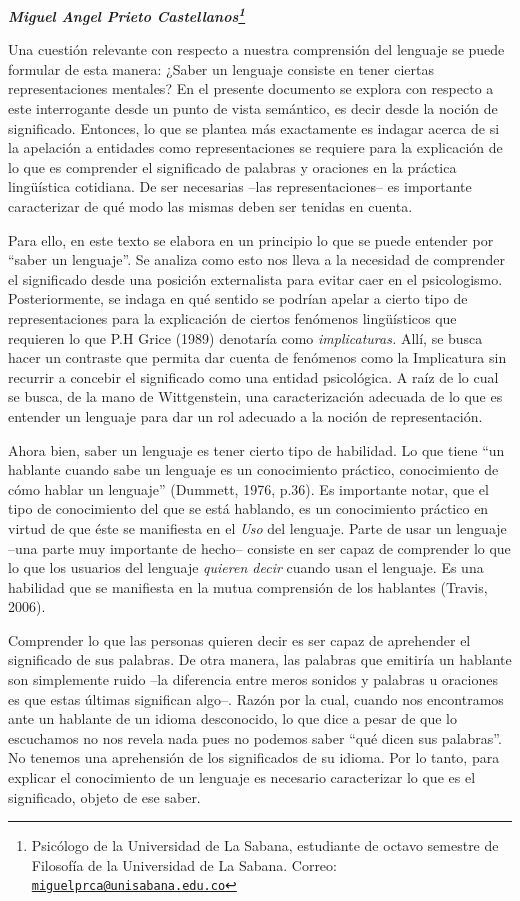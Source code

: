 \documentclass[]{book}
\newcommand{\autor}[1]{            %
  \begin{center}                   %
    \vspace*{-3.5em}               %
    \textbf{\textit{\large #1}}    %
    \vspace*{+4em}                 %
  \end{center}
}
\begin{document}
\autor{Miguel Angel Prieto Castellanos\footnote{Psicólogo de la
  Universidad de La Sabana, estudiante de octavo semestre de Filosofía
  de la Universidad de La Sabana. Correo:
  \href{mailto:miguelprca@unisabana.edu.co}{\nolinkurl{miguelprca@unisabana.edu.co}}}}

Una cuestión relevante con respecto a nuestra comprensión del lenguaje
se puede formular de esta manera: ¿Saber un lenguaje consiste en tener
ciertas representaciones mentales? En el presente documento se explora
con respecto a este interrogante desde un punto de vista semántico, es
decir desde la noción de significado. Entonces, lo que se plantea más
exactamente es indagar acerca de si la apelación a entidades como
representaciones se requiere para la explicación de lo que es comprender
el significado de palabras y oraciones en la práctica lingüística
cotidiana. De ser necesarias --las representaciones-- es importante
caracterizar de qué modo las mismas deben ser tenidas en cuenta.

Para ello, en este texto se elabora en un principio lo que se puede
entender por ``saber un lenguaje''. Se analiza como esto nos lleva a la
necesidad de comprender el significado desde una posición externalista
para evitar caer en el psicologismo. Posteriormente, se indaga en qué
sentido se podrían apelar a cierto tipo de representaciones para la
explicación de ciertos fenómenos lingüísticos que requieren lo que P.H
Grice (1989) denotaría como \emph{implicaturas.} Allí, se busca hacer un
contraste que permita dar cuenta de fenómenos como la Implicatura sin
recurrir a concebir el significado como una entidad psicológica. A raíz
de lo cual se busca, de la mano de Wittgenstein, una caracterización
adecuada de lo que es entender un lenguaje para dar un rol adecuado a la
noción de representación.

Ahora bien, saber un lenguaje es tener cierto tipo de habilidad. Lo que
tiene ``un hablante cuando sabe un lenguaje es un conocimiento práctico,
conocimiento de cómo hablar un lenguaje'' (Dummett, 1976, p.36). Es
importante notar, que el tipo de conocimiento del que se está hablando,
es un conocimiento práctico en virtud de que éste se manifiesta en el
\emph{Uso} del lenguaje. Parte de usar un lenguaje --una parte muy
importante de hecho-- consiste en ser capaz de comprender lo que lo que
los usuarios del lenguaje \emph{quieren decir} cuando usan el lenguaje.
Es una habilidad que se manifiesta en la mutua comprensión de los
hablantes (Travis, 2006).

Comprender lo que las personas quieren decir es ser capaz de aprehender
el significado de sus palabras. De otra manera, las palabras que
emitiría un hablante son simplemente ruido --la diferencia entre meros
sonidos y palabras u oraciones es que estas últimas significan algo--.
Razón por la cual, cuando nos encontramos ante un hablante de un idioma
desconocido, lo que dice a pesar de que lo escuchamos no nos revela nada
pues no podemos saber ``qué dicen sus palabras''. No tenemos una
aprehensión de los significados de su idioma. Por lo tanto, para
explicar el conocimiento de un lenguaje es necesario caracterizar lo que
es el significado, objeto de ese saber.
\end{document}
